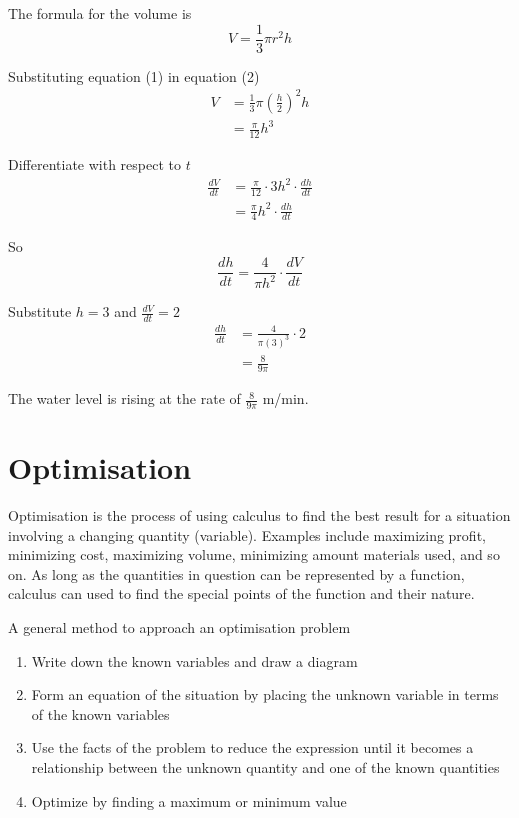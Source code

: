 The formula for the volume is
\begin{equation}V =\frac{1}{3} \pi  r^{2} h\tag{2}
\end{equation}

Substituting equation (1) in equation (2)
\begin{align*}V &  = \frac{1}{3} \pi  \genfrac{(}{)}{}{}{h}{2}^{2} h \\
 &  = \frac{\pi }{12} h^{3}\end{align*}

Differentiate with respect to $t$
\begin{align*}\frac{d V}{d t} &  = \frac{\pi }{12} \cdot 3 h^{2} \cdot \frac{d h}{d t} \\
 &  = \frac{\pi }{4} h^{2} \cdot \frac{d h}{d t}\end{align*}

So
\begin{equation*}\frac{d h}{d t} =\frac{4}{\pi  h^{2}} \cdot \frac{d V}{d t}
\end{equation*}

Substitute $h =3$ and $\frac{d V}{d t} =2$
\begin{align*}\frac{d h}{d t} &  = \frac{4}{\pi  \left (3\right )^{3}} \cdot 2 \\
 &  = \frac{8}{9 \pi }\end{align*}

The water level is rising at the rate of $\frac{8}{9 \pi }$ $\mbox{m}$/$\mbox{min}$. 

\section{Optimisation}\label{sec:Optimisation}
Optimisation is the process of using calculus to find the best result for a situation involving a changing quantity (variable). Examples include  maximizing profit, minimizing cost, maximizing volume, minimizing amount materials used, and so on. As long as the quantities in question can be represented by a function, calculus can used to find the special points of the function and their nature.

\begin{tcolorbox}
	A general method to approach an optimisation problem             
	\begin{enumerate}
		\item Write down the known variables and draw a diagram
		\item Form an equation of the situation by placing the unknown variable in terms of the known variables
		\item Use the facts of the problem to reduce the expression until it becomes a relationship between the unknown quantity and one of the known quantities
		\item Optimize by finding a maximum or minimum value
	\end{enumerate}
\end{tcolorbox}


